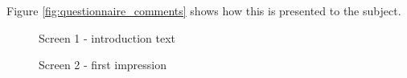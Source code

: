Figure \ref{fig:questionnaire_comments} shows how this is presented to the subject.

\begin{figure}
    \centering
    \caption{Screen 1 - introduction text}
    \label{fig:questionnaire_intro}
\end{figure}
 
\begin{figure}
    \centering
    \caption{Screen 2 - first impression}
    \label{fig:questionnaire_firstImpression}
\end{figure}
 
